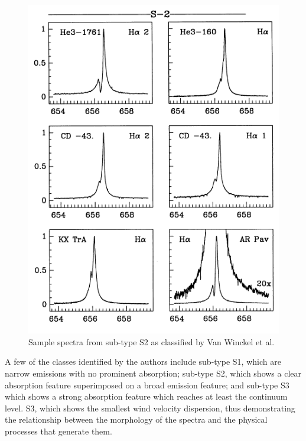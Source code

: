 \begin{figure}[!htb]
\centering
\includegraphics[scale=0.75]{figures/van.png}
\caption{Sample spectra from sub-type S2 as classified by Van Winckel et al.}
\end{figure}

A few of the classes identified by the authors include sub-type S1, which are narrow emissions with no prominent absorption; sub-type S2, which shows a clear absorption feature superimposed on a broad emission feature; and sub-type S3 which shows a strong absorption feature which reaches at least the continuum level. S3, which shows the smallest wind velocity dispersion, thus demonstrating the relationship between the morphology of the spectra and the physical processes that generate them.


